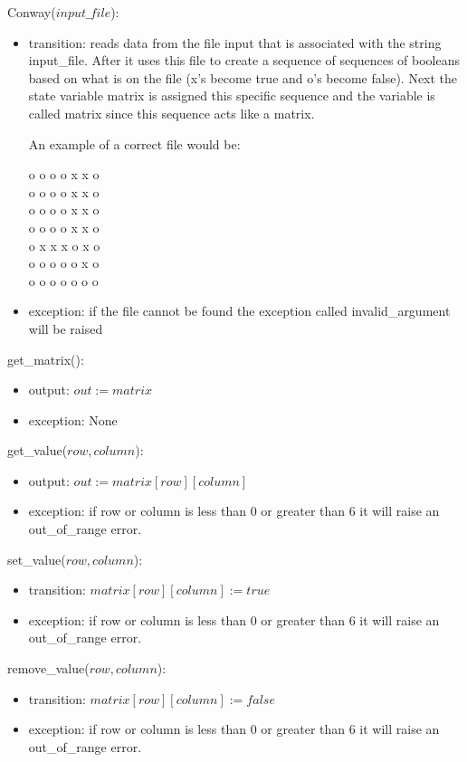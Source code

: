 \documentclass[12pt]{article}
\begin{document}
\noindent Conway($input\_file$):
\begin{itemize}

\item transition: reads data from the file input that is associated with the string input\_file. After it uses this file to create a sequence of sequences of booleans based on what is on the file (x's become true and o's become false). Next the state variable matrix is assigned this specific sequence and the variable is called matrix since this sequence acts like a matrix. 

An example of a correct file would be: 

o o o o x x o\\
o o o o x x o\\
o o o o x x o\\
o o o o x x o\\
o x x x o x o\\
o o o o o x o\\
o o o o o o o\\

\item exception: if the file cannot be found the exception called invalid\_argument will be raised
\end{itemize}

\noindent get\_matrix():
\begin{itemize}
\item output: $out := matrix$
\item exception: None
\end{itemize}

\noindent get\_value($row, column$):
\begin{itemize}
\item output: $out := matrix[row][column]$
\item exception: if row or column is less than 0 or greater than 6 it will raise an out\_of\_range error.
\end{itemize}

\noindent set\_value($row, column$):
\begin{itemize}
\item transition: $matrix[row][column] := true$
\item exception: if row or column is less than 0 or greater than 6 it will raise an out\_of\_range error.
\end{itemize}

\newpage

\noindent remove\_value($row, column$):
\begin{itemize}
\item transition: $matrix[row][column] := false$
\item exception: if row or column is less than 0 or greater than 6 it will raise an out\_of\_range error.
\end{itemize}
\end{document}
